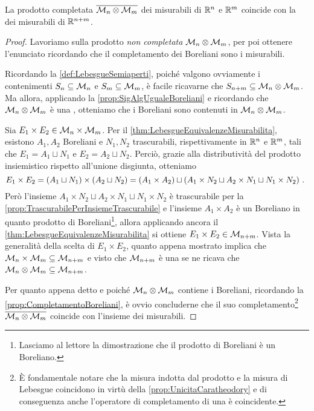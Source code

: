 \begin{proposition}\label{prop:MisuraProdottoEuclidea}
	La \sigalg{} prodotto completata $\overline{\mathcal M_n\otimes\mathcal M_m}$ dei misurabili di $\mathbb R^n$ e $\mathbb R^m$ coincide con la \sigalg{} dei misurabili di $\mathbb R^{n+m}$.
\end{proposition}
\begin{proof}
	Lavoriamo sulla \sigalg{} prodotto \emph{non completata} $\mathcal M_n\otimes\mathcal M_m$, per poi ottenere l'enunciato ricordando che il completamento dei Boreliani sono i misurabili.

	Ricordando la \cref{def:LebesgueSemiaperti}, poiché valgono ovviamente i contenimenti $S_n\subseteq \mathcal M_n$ e $S_m\subseteq \mathcal M_m$, è facile ricavarne che $S_{n+m}\subseteq \mathcal M_n\otimes \mathcal M_m$.
	Ma allora, applicando la \cref{prop:SigAlgUgualeBoreliani} e ricordando che $\mathcal M_n\otimes \mathcal M_m$ è una \sigalg{}, otteniamo che i Boreliani sono contenuti in $\mathcal M_n\otimes\mathcal M_m$.
	
	Sia $E_1\times E_2\in \mathcal M_n\times\mathcal M_m$. Per il \cref{thm:LebesgueEquivalenzeMisurabilita}, esistono $A_1,A_2$ Boreliani e $N_1,N_2$ trascurabili, rispettivamente in $\mathbb R^n$ e $\mathbb R^m$, tali che $E_1=A_1\sqcup N_1$ e $E_2=A_2\sqcup N_2$.
	Perciò, grazie alla distributività del prodotto insiemistico rispetto all'unione disgiunta, otteniamo
	\begin{equation*}
		E_1\times E_2=(A_1\sqcup N_1)\times(A_2\sqcup N_2)=\left(A_1\times A_2\right)\sqcup\left(A_1\times N_2\sqcup A_2\times N_1 \sqcup N_1\times N_2\right) \, \text{. }
	\end{equation*}
	Però l'insieme $A_1\times N_2\sqcup A_2\times N_1 \sqcup N_1\times N_2$ è trascurabile per la \cref{prop:TrascurabilePerInsiemeTrascurabile} e l'insieme $A_1\times A_2$ è un Boreliano in quanto prodotto di Boreliani\footnote{Lasciamo al lettore la dimostrazione che il prodotto di Boreliani è un Boreliano.}, allora applicando ancora il \cref{thm:LebesgueEquivalenzeMisurabilita} si ottiene $E_1\times E_2\in\mathcal M_{n+m}$.
	Vista la generalità della scelta di $E_1\times E_2$, quanto appena mostrato implica che $\mathcal M_n\times\mathcal M_m\subseteq \mathcal M_{n+m}$ e visto che $\mathcal M_{n+m}$ è una \sigalg{} se ne ricava che $\mathcal M_n\otimes\mathcal M_m\subseteq \mathcal M_{n+m}$.
	
	Per quanto appena detto e poiché $\mathcal M_n\otimes\mathcal M_m$ contiene i Boreliani, ricordando la \cref{prop:CompletamentoBoreliani}, è ovvio concluderne che il suo completamento\footnote{È fondamentale notare che la misura indotta dal prodotto e la misura di Lebesgue coincidono in virtù della \cref{prop:UnicitaCaratheodory} e di conseguenza anche l'operatore di completamento di una \sigalg{} è coincidente.} $\overline{\mathcal M_n\otimes\mathcal M_m}$ coincide con l'insieme dei misurabili.
\end{proof}


